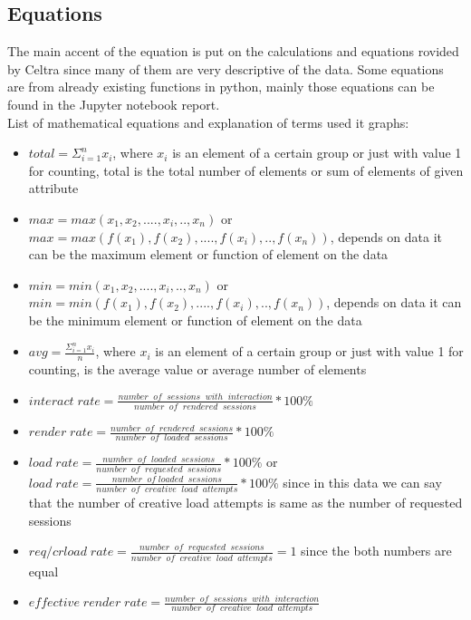 \documentclass[fleqn,moreauthors,10pt]{ds_report}
\begin{document}
\subsection*{Equations}

The main accent of the equation is put on the calculations and equations rovided by Celtra since many of them are very descriptive of the data. Some equations are from already existing functions in python, mainly those equations can be
found in the Jupyter notebook report.
\\List of mathematical equations and explanation of terms used it graphs:
\begin{itemize}[noitemsep]
	\item {$total=\Sigma_{i=1}^nx_i$, where $x_i$ is an element of a certain group or just with value 1 for counting, total is the total number of elements or sum of elements of given attribute}
	\item {$max=max({x_1,x_2,....,x_i,..,x_n})$ or\\ $max=max({f(x_1),f(x_2),....,f(x_i),..,f(x_n)})$, depends on data it can be the maximum element or function of element on the data }
	\item {$min=min({x_1,x_2,....,x_i,..,x_n})$ or\\ $min=min({f(x_1),f(x_2),....,f(x_i),..,f(x_n)})$, depends on data it can be the minimum element or function of element on the data }
	\item {$avg=\frac{\Sigma_{i=1}^nx_i}{n}$, where $x_i$ is an element of a certain group or just with value 1 for counting, is the average value or average number of elements}
	\item {$interact\; rate=\frac{number\;\; of \;\;sessions \;\;with \;\;interaction}{number\;\; of\;\; rendered\;\; sessions}*100\%$}
	\item {$render\; rate=\frac{number\;\; of\;\; rendered\;\; sessions}{number\;\; of\;\; loaded\; \;sessions}*100\%$}
	\item {$load\; rate=\frac{number\;\; of\;\; loaded\;\; sessions}{number\;\; of\;\; requested\;\; sessions}*100\%$ or
		\\$load \;rate=\frac{number\;\; of \;loaded \;\;sessions}{number\;\; of\;\; creative \;\;load \;\;attempts}*100\%$ since in this data we can say that the number of creative load attempts is same as the number of requested sessions }
	\item {$req/crload\;rate=\frac{number \;\;of\;\; requested \;\;sessions}{number \;\;of\;\; creative \;\;load\;\; attempts}=1$ since the both numbers are equal }
	\item {$effective \;render \;rate=\frac{number\;\; of \;\;sessions \;\;with \;\;interaction}{number \;\;of\;\; creative \;\;load\;\; attempts}$}
\end{itemize}
\FloatBarrier
\end{document}
